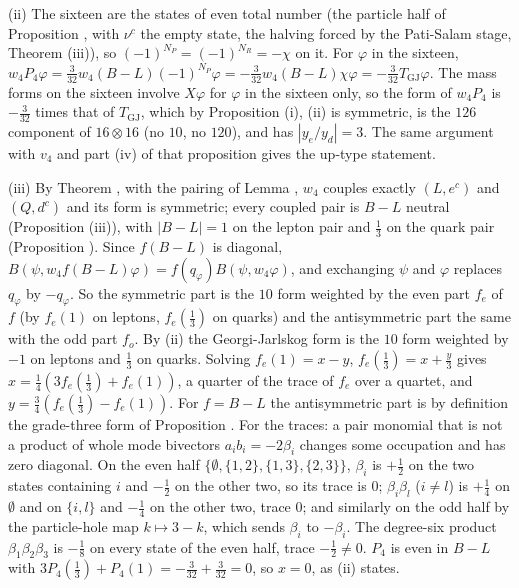 (ii) The sixteen are the states of even total number (the particle half of Proposition , with $\nu^{c}$ the empty state, the halving forced by the Pati-Salam stage, Theorem (iii)), so $(-1)^{N_{P}} = (-1)^{N_{R}} = -\chi$ on it. For $\varphi$ in the sixteen, $w_{4}P_{4}\varphi = \tfrac{3}{32}w_{4}(B - L)(-1)^{N_{P}}\varphi = -\tfrac{3}{32}w_{4}(B - L)\chi\varphi = -\tfrac{3}{32}T_{\mathrm{GJ}}\varphi$. The mass forms on the sixteen involve $X\varphi$ for $\varphi$ in the sixteen only, so the form of $w_{4}P_{4}$ is $-\tfrac{3}{32}$ times that of $T_{\mathrm{GJ}}$, which by Proposition (i), (ii) is symmetric, is the $126$ component of $16 \otimes 16$ (no $10$, no $120$), and has $|y_{e}/y_{d}| = 3$. The same argument with $v_{4}$ and part (iv) of that proposition gives the up-type statement.

(iii) By Theorem , with the pairing of Lemma , $w_{4}$ couples exactly $(L, e^{c})$ and $(Q, d^{c})$ and its form is symmetric; every coupled pair is $B - L$ neutral (Proposition (iii)), with $|B - L| = 1$ on the lepton pair and $\tfrac13$ on the quark pair (Proposition ). Since $f(B - L)$ is diagonal, $B(\psi, w_{4}f(B - L)\varphi) = f(q_{\varphi})B(\psi, w_{4}\varphi)$, and exchanging $\psi$ and $\varphi$ replaces $q_{\varphi}$ by $-q_{\varphi}$. So the symmetric part is the $10$ form weighted by the even part $f_{e}$ of $f$ (by $f_{e}(1)$ on leptons, $f_{e}(\tfrac13)$ on quarks) and the antisymmetric part the same with the odd part $f_{o}$. By (ii) the Georgi-Jarlskog form is the $10$ form weighted by $-1$ on leptons and $\tfrac13$ on quarks. Solving $f_{e}(1) = x - y$, $f_{e}(\tfrac13) = x + \tfrac{y}{3}$ gives $x = \tfrac14(3f_{e}(\tfrac13) + f_{e}(1))$, a quarter of the trace of $f_{e}$ over a quartet, and $y = \tfrac34(f_{e}(\tfrac13) - f_{e}(1))$. For $f = B - L$ the antisymmetric part is by definition the grade-three form of Proposition . For the traces: a pair monomial that is not a product of whole mode bivectors $a_{i}b_{i} = -2\beta_{i}$ changes some occupation and has zero diagonal. On the even half $\{\emptyset, \{1,2\}, \{1,3\}, \{2,3\}\}$, $\beta_{i}$ is $+\tfrac12$ on the two states containing $i$ and $-\tfrac12$ on the other two, so its trace is $0$; $\beta_{i}\beta_{l}$ ($i \ne l$) is $+\tfrac14$ on $\emptyset$ and on $\{i, l\}$ and $-\tfrac14$ on the other two, trace $0$; and similarly on the odd half by the particle-hole map $k \mapsto 3 - k$, which sends $\beta_{i}$ to $-\beta_{i}$. The degree-six product $\beta_{1}\beta_{2}\beta_{3}$ is $-\tfrac18$ on every state of the even half, trace $-\tfrac12 \ne 0$. $P_{4}$ is even in $B - L$ with $3P_{4}(\tfrac13) + P_{4}(1) = -\tfrac{3}{32} + \tfrac{3}{32} = 0$, so $x = 0$, as (ii) states.


